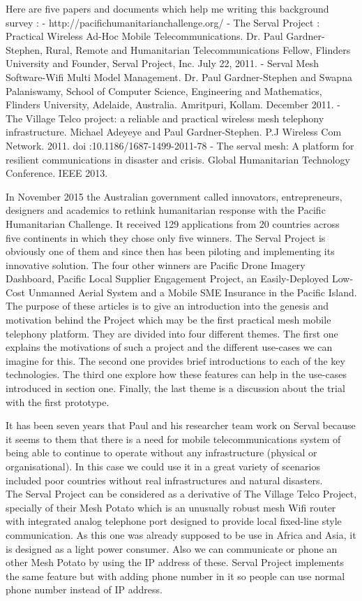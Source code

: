 \documentclass[a4paper, 11pt, oneside]{Thesis}  %
\begin{document}
Here are five papers and documents which help me writing this background survey :
- http://pacifichumanitarianchallenge.org/ 
- The Serval Project : Practical Wireless Ad-Hoc Mobile Telecommunications. Dr. Paul Gardner-Stephen, Rural, Remote and Humanitarian Telecommunications Fellow, Flinders University and Founder, Serval Project, Inc. July 22, 2011.
- Serval Mesh Software-Wifi Multi Model Management. Dr. Paul Gardner-Stephen and Swapna Palaniswamy, School of Computer Science, Engineering and Mathematics, Flinders University, Adelaide, Australia. Amritpuri, Kollam. December 2011. 
- The Village Telco project: a reliable and practical wireless mesh telephony infrastructure. Michael Adeyeye and Paul Gardner-Stephen. P.J Wireless Com Network. 2011. doi :10.1186/1687-1499-2011-78
- The serval mesh: A platform for resilient communications in disaster and crisis. Global Humanitarian Technology Conference. IEEE 2013.

In November 2015 the Australian government called innovators, entrepreneurs, designers and academics to rethink humanitarian response with the Pacific Humanitarian Challenge. It received 129 applications from 20 countries across five continents in which they chose only five winners. The Serval Project is obviously one of them and since then has been piloting and implementing its innovative solution. The four other winners are Pacific Drone Imagery Dashboard, Pacific Local Supplier Engagement Project, an Easily-Deployed Low-Cost Unmanned Aerial System and a Mobile SME Insurance in the Pacific Island. 
 \\

The purpose of these articles is to give an introduction into the genesis and motivation behind the Project which may be the first practical mesh mobile telephony platform.  They are divided into four different themes. The first one explains the motivations of such a project and the different use-cases we can imagine for this. The second one provides brief introductions to each of the key technologies. The third one explore how these features can help in the use-cases introduced in section one. Finally, the last theme is a discussion about the trial with the first prototype. \par

It has been seven years that Paul and his researcher team work on Serval because it seems to them that there is a need for mobile telecommunications system of being able to continue to operate without any infrastructure (physical or organisational). In this case we could use it in a great variety of scenarios included poor countries without real infrastructures and natural disasters. \\
The Serval Project can be considered as a derivative of The Village Telco Project, specially of their Mesh Potato which is an unusually robust mesh Wifi router with integrated analog telephone port designed to provide local fixed-line style communication. As this one was already supposed to be use in Africa and Asia, it is designed as a light power consumer. Also we can communicate or phone an other Mesh Potato by using the IP address of these. Serval Project implements the same feature but with adding phone number in it so people can use normal phone number instead of IP address.
\end{document}
